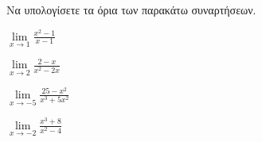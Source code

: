 Να υπολογίσετε τα όρια των παρακάτω συναρτήσεων.
\begin{multicols}{2}
\begin{alist}
\item $ \lim\limits_{x\to 1}\frac{x^2-1}{x-1} $
\item $ \lim\limits_{x\to 2}\frac{2-x}{x^2-2x} $
\item $ \lim\limits_{x\to-5}\frac{25-x^2}{x^3+5x^2} $
\item $ \lim\limits_{x\to -2}{\frac{x^3+8}{x^2-4}} $
\end{alist}
\end{multicols}
